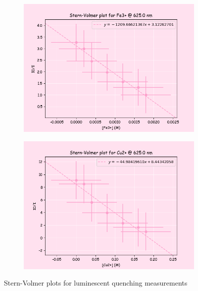 \begin{figure}[H]
     \centering
     \begin{subfigure}[b]{0.49\textwidth}
         \centering
         \includegraphics[width=\textwidth]{part1_q1_Fe.png}
         \caption{}
         \label{fig:part1_q1_fe}
     \end{subfigure}
     \hfill
     \begin{subfigure}[b]{0.49\textwidth}
         \centering
         \includegraphics[width=\textwidth]{part1_q1_Cu.png}
         \caption{}
         \label{fig:part1_q1_Cu}
     \end{subfigure}
     \caption{Stern-Volmer plots for luminescent quenching measurements}
     \label{fig:stern_volmers}
\end{figure}